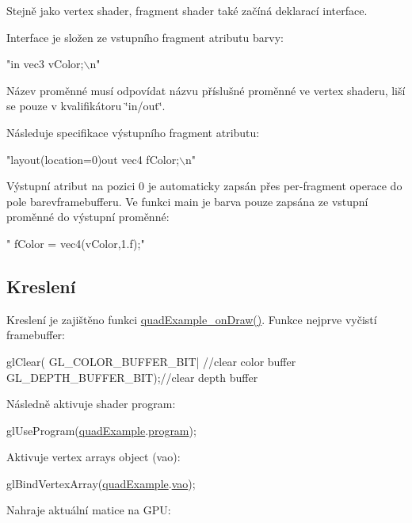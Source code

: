 Stejně jako vertex shader, fragment shader také začíná deklarací interface.\par
 Interface je složen ze vstupního fragment atributu barvy\-: 
\begin{DoxyCodeInclude}
\textcolor{stringliteral}{"in vec3 vColor;\(\backslash\)n"}
\end{DoxyCodeInclude}
Název proměnné musí odpovídat názvu příslušné proměnné ve vertex shaderu, liší se pouze v kvalifikátoru \char`\"{}in/out\char`\"{}.\par
 Následuje specifikace výstupního fragment atributu\-: 
\begin{DoxyCodeInclude}
\textcolor{stringliteral}{"layout(location=0)out vec4 fColor;\(\backslash\)n"}
\end{DoxyCodeInclude}
Výstupní atribut na pozici 0 je automaticky zapsán přes per-\/fragment operace do pole barevframebufferu. Ve funkci main je barva pouze zapsána ze vstupní proměnné do výstupní proměnné\-: 
\begin{DoxyCodeInclude}
\textcolor{stringliteral}{"  fColor = vec4(vColor,1.f);"}
\end{DoxyCodeInclude}
\hypertarget{quadExample.c_Draw}{}\subsection{Kreslení}\label{quadExample.c_Draw}
Kreslení je zajištěno funkci \hyperlink{quadExample_8c_a357ede357c44b3a5a41681591a1108c8}{quad\-Example\-\_\-on\-Draw()}. Funkce nejprve vyčistí framebuffer\-: 
\begin{DoxyCodeInclude}
  glClear(
      GL\_COLOR\_BUFFER\_BIT| \textcolor{comment}{//clear color buffer}
      GL\_DEPTH\_BUFFER\_BIT);\textcolor{comment}{//clear depth buffer}
\end{DoxyCodeInclude}
Následně aktivuje shader program\-: 
\begin{DoxyCodeInclude}
  glUseProgram(\hyperlink{quadExample_8c_ad961415145a9c30bd9846d4a278cc63a}{quadExample}.\hyperlink{structQuadExampleVariables_a63971781ff860bd201886926f943ba78}{program});
\end{DoxyCodeInclude}
Aktivuje vertex arrays object (vao)\-: 
\begin{DoxyCodeInclude}
  glBindVertexArray(\hyperlink{quadExample_8c_ad961415145a9c30bd9846d4a278cc63a}{quadExample}.\hyperlink{structQuadExampleVariables_a294c388653d62435d7eeb7994f45c4fc}{vao});
\end{DoxyCodeInclude}
Nahraje aktuální matice na G\-P\-U\-: 
